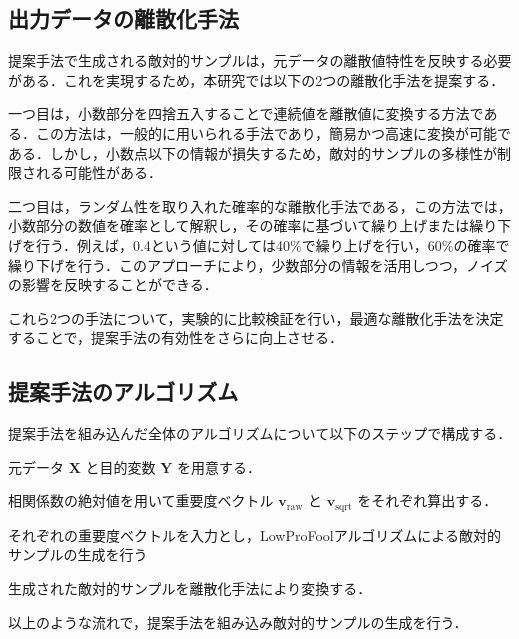 \subsection{出力データの離散化手法}
提案手法で生成される敵対的サンプルは，元データの離散値特性を反映する必要がある．これを実現するため，本研究では以下の2つの離散化手法を提案する．

一つ目は，小数部分を四捨五入することで連続値を離散値に変換する方法である．この方法は，一般的に用いられる手法であり，簡易かつ高速に変換が可能である．しかし，小数点以下の情報が損失するため，敵対的サンプルの多様性が制限される可能性がある．

二つ目は，ランダム性を取り入れた確率的な離散化手法である，この方法では，小数部分の数値を確率として解釈し，その確率に基づいて繰り上げまたは繰り下げを行う．例えば，0.4という値に対しては40\%で繰り上げを行い，60\%の確率で繰り下げを行う．このアプローチにより，少数部分の情報を活用しつつ，ノイズの影響を反映することができる．

これら2つの手法について，実験的に比較検証を行い，最適な離散化手法を決定することで，提案手法の有効性をさらに向上させる．

\subsection{提案手法のアルゴリズム}
提案手法を組み込んだ全体のアルゴリズムについて以下のステップで構成する．

\begin{algorithm_step}
    \item[Step 1)] 元データ $\bm{X}$ と目的変数 $\bm{Y}$ を用意する．
    \item[Step 2)] 相関係数の絶対値を用いて重要度ベクトル $\bm{v_{\mathrm{raw}}}$ と $\bm{v_{\mathrm{sqrt}}}$ をそれぞれ算出する．
    \item[Step 3)] それぞれの重要度ベクトルを入力とし，LowProFoolアルゴリズムによる敵対的サンプルの生成を行う
    \item[Step 4)] 生成された敵対的サンプルを離散化手法により変換する．
\end{algorithm_step}

以上のような流れで，提案手法を組み込み敵対的サンプルの生成を行う．